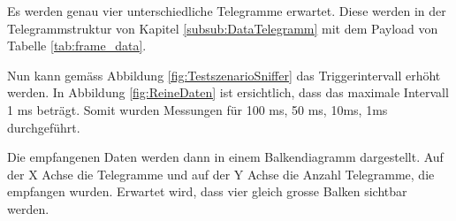 Es werden genau vier unterschiedliche Telegramme erwartet. Diese werden in der Telegrammstruktur von Kapitel \ref{subsub:DataTelegramm} mit dem Payload von Tabelle \ref{tab:frame_data}.

Nun kann gemäss Abbildung \ref{fig:TestszenarioSniffer} das Triggerintervall erhöht werden. In Abbildung \ref{fig:ReineDaten} ist ersichtlich, dass das maximale Intervall 1 ms beträgt. Somit wurden Messungen für 100 ms, 50 ms, 10ms, 1ms durchgeführt.

Die empfangenen Daten werden dann in einem Balkendiagramm dargestellt. Auf der X Achse die Telegramme und auf der Y Achse die Anzahl Telegramme, die empfangen wurden. Erwartet wird, dass vier gleich grosse Balken sichtbar werden.


